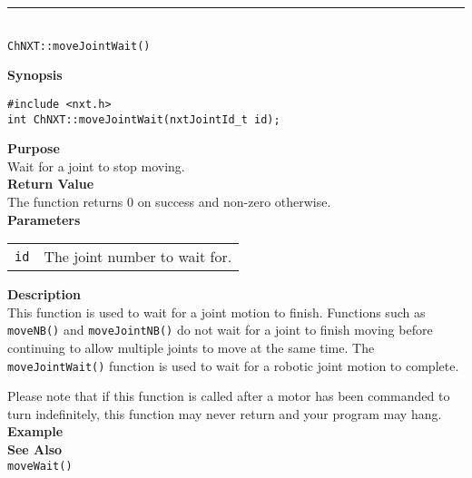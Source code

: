 \noindent
\vspace{5pt}
\rule{4.5in}{0.015in}\\
\noindent
{\LARGE \texttt{ChNXT::moveJointWait()}}\\
{}

\noindent
{\bf Synopsis}
\vspace{-8pt}
\begin{verbatim}
#include <nxt.h>
int ChNXT::moveJointWait(nxtJointId_t id);
\end{verbatim}

\noindent
{\bf Purpose}\\
Wait for a joint to stop moving.\\

\noindent
{\bf Return Value}\\
The function returns 0 on success and non-zero otherwise.\\

\noindent
{\bf Parameters}
\vspace{-0.1in}
\begin{description}
\item               
\begin{tabular}{p{10 mm}p{145 mm}}
\texttt{id} & The joint number to wait for. \\
\end{tabular}
\end{description}

\noindent
{\bf Description}\\
This function is used to wait for a joint motion to finish. Functions such as
\texttt{moveNB()} and \texttt{moveJointNB()} do not wait for a joint to finish
moving before continuing to allow multiple joints to move at the same time. The
\texttt{moveJointWait()} function is used to wait for a 
robotic joint motion to complete.

Please note that if this function is called after a motor has been commanded to
turn indefinitely, this function may never return and your program may hang.\\

\noindent
{\bf Example}\\

\noindent
{\bf See Also}\\
\texttt{moveWait()}

